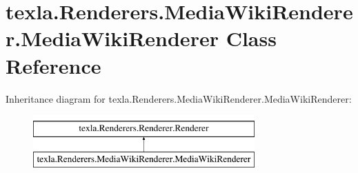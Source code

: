 \hypertarget{classtexla_1_1Renderers_1_1MediaWikiRenderer_1_1MediaWikiRenderer}{}\section{texla.\+Renderers.\+Media\+Wiki\+Renderer.\+Media\+Wiki\+Renderer Class Reference}
\label{classtexla_1_1Renderers_1_1MediaWikiRenderer_1_1MediaWikiRenderer}
Inheritance diagram for texla.\+Renderers.\+Media\+Wiki\+Renderer.\+Media\+Wiki\+Renderer\+:\begin{figure}[H]
\begin{center}
\leavevmode
\includegraphics[height=2.000000cm]{classtexla_1_1Renderers_1_1MediaWikiRenderer_1_1MediaWikiRenderer}
\end{center}
\end{figure}
